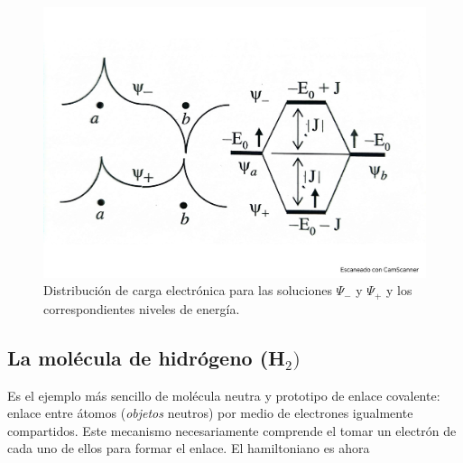 \begin{figure}[h!] \centering
    \includegraphics[scale=0.5]{Cuerpo/Ch_03/Fotos libro 4.pdf}
    \caption{Distribución de carga electrónica para las soluciones $\Psi_-$ y $\Psi_+$ y los correspondientes niveles de energía.}
    \label{Fig:03-05}
\end{figure}    



\subsection{La molécula de hidrógeno (H$_2)$} \label{Subsec:03-04-02}

Es el ejemplo más sencillo de molécula neutra y prototipo de enlace covalente: enlace entre átomos (\textit{objetos} neutros) por medio de electrones igualmente compartidos. Este mecanismo necesariamente comprende el tomar un electrón de cada uno de ellos para formar el enlace. El hamiltoniano es ahora

